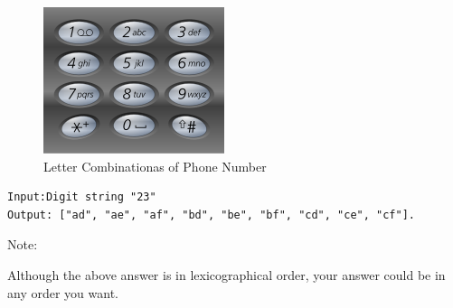 \documentclass[12pt]{book}
\begin{document}
\begin{figure}[htb]
\centering
\includegraphics[width=.9\linewidth]{./pic/phoneNumber.png}
\caption{Letter Combinationas of Phone Number}
\end{figure}
\lstset{language=java,label= ,caption= ,numbers=none}
\begin{lstlisting}
Input:Digit string "23"
Output: ["ad", "ae", "af", "bd", "be", "bf", "cd", "ce", "cf"].
\end{lstlisting}
Note:

Although the above answer is in lexicographical order, your answer
could be in any order you want.
\end{document}
